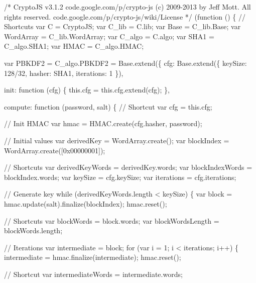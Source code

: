 \begin{DoxyCodeInclude}
\textcolor{comment}{/*}
\textcolor{comment}{CryptoJS v3.1.2}
\textcolor{comment}{code.google.com/p/crypto-js}
\textcolor{comment}{(c) 2009-2013 by Jeff Mott. All rights reserved.}
\textcolor{comment}{code.google.com/p/crypto-js/wiki/License}
\textcolor{comment}{*/}
(\textcolor{keyword}{function} () \{
    \textcolor{comment}{// Shortcuts}
    var C = CryptoJS;
    var C\_lib = C.lib;
    var Base = C\_lib.Base;
    var WordArray = C\_lib.WordArray;
    var C\_algo = C.algo;
    var SHA1 = C\_algo.SHA1;
    var HMAC = C\_algo.HMAC;

    var PBKDF2 = C\_algo.PBKDF2 = Base.extend(\{
        cfg: Base.extend(\{
            keySize: 128/32,
            hasher: SHA1,
            iterations: 1
        \}),

        init: \textcolor{keyword}{function} (cfg) \{
            this.cfg = this.cfg.extend(cfg);
        \},

        compute: \textcolor{keyword}{function} (password, salt) \{
            \textcolor{comment}{// Shortcut}
            var cfg = this.cfg;

            \textcolor{comment}{// Init HMAC}
            var hmac = HMAC.create(cfg.hasher, password);

            \textcolor{comment}{// Initial values}
            var derivedKey = WordArray.create();
            var blockIndex = WordArray.create([0x00000001]);

            \textcolor{comment}{// Shortcuts}
            var derivedKeyWords = derivedKey.words;
            var blockIndexWords = blockIndex.words;
            var keySize = cfg.keySize;
            var iterations = cfg.iterations;

            \textcolor{comment}{// Generate key}
            \textcolor{keywordflow}{while} (derivedKeyWords.length < keySize) \{
                var block = hmac.update(salt).finalize(blockIndex);
                hmac.reset();

                \textcolor{comment}{// Shortcuts}
                var blockWords = block.words;
                var blockWordsLength = blockWords.length;

                \textcolor{comment}{// Iterations}
                var intermediate = block;
                \textcolor{keywordflow}{for} (var i = 1; i < iterations; i++) \{
                    intermediate = hmac.finalize(intermediate);
                    hmac.reset();

                    \textcolor{comment}{// Shortcut}
                    var intermediateWords = intermediate.words;


\end{DoxyCodeInclude}
